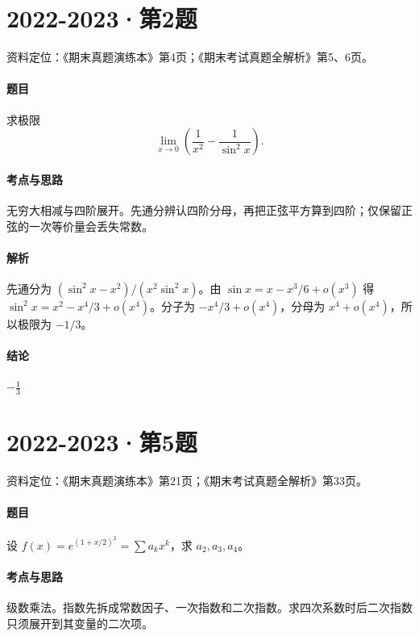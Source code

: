 \documentclass[UTF8,fontset=fandol,12pt,oneside,openany]{ctexrep}
\theoremstyle{definition}
\begin{document}
\par\addvspace{18pt}\noindent\begin{minipage}{\linewidth}
\section{2022-2023·第2题}
\label{exam:08:q7}
资料定位：《期末真题演练本》第4页；《期末考试真题全解析》第5、6页。
\paragraph{题目}
求极限 \[\lim_{x\to0}\left(\frac1{x^2}-\frac1{\sin^2x}\right).\]
\end{minipage}\par
\paragraph{考点与思路}
无穷大相减与四阶展开。先通分辨认四阶分母，再把正弦平方算到四阶；仅保留正弦的一次等价量会丢失常数。
\paragraph{解析}
先通分为 $(\sin^2x-x^2)/(x^2\sin^2x)$。由 $\sin x=x-x^3/6+o(x^3)$ 得 $\sin^2x=x^2-x^4/3+o(x^4)$。分子为 $-x^4/3+o(x^4)$，分母为 $x^4+o(x^4)$，所以极限为 $-1/3$。
\paragraph{结论}
$-\frac13$

\par\addvspace{18pt}\noindent\begin{minipage}{\linewidth}
\section{2022-2023·第5题}
\label{exam:08:q8}
资料定位：《期末真题演练本》第21页；《期末考试真题全解析》第33页。
\paragraph{题目}
设 $f(x)=e^{(1+x/2)^2}=\sum a_kx^k$，求 $a_2,a_3,a_4$。
\end{minipage}\par
\paragraph{考点与思路}
级数乘法。指数先拆成常数因子、一次指数和二次指数。求四次系数时后二次指数只须展开到其变量的二次项。
\end{document}

